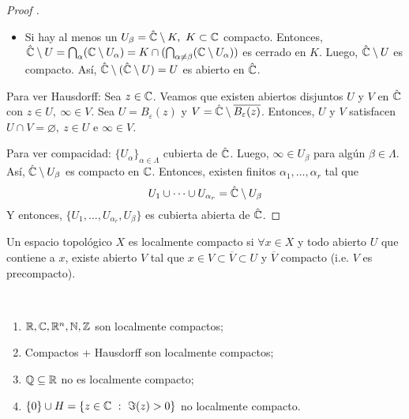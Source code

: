 \begin{proof}[Proof ]
\begin{enumerate}
\begin{itemize}
			\item Si hay al menos un $U_{\beta} = \hat{\mathbb{C}} \setminus K,\ K \subset \mathbb{C}$ compacto. Entonces, $\hat{\mathbb{C}} \setminus U = \bigcap_{\alpha} (\mathbb{C} \setminus U_{\alpha}) = K \cap (\bigcap_{\alpha \neq \beta} (\mathbb{C} \setminus U_{\alpha}))$ es cerrado en $K$. Luego, $\hat{\mathbb{C}} \setminus U$ es compacto. Así, $\hat{\mathbb{C}} \setminus (\hat{\mathbb{C}} \setminus U) = U$ es abierto en $\hat{\mathbb{C}}$.
		\end{itemize}
	\end{enumerate}
	\hspace{4mm} Para ver Hausdorff: Sea $z \in \mathbb{C}$. Veamos que existen abiertos disjuntos $U$ y $V$ en $\hat{\mathbb{C}}$ con $z \in U,\ \infty \in V$. Sea $U = B_{\varepsilon}(z)$ y $V = \hat{\mathbb{C}} \setminus \overline{B_{\varepsilon}(z)}$. Entonces, $U$ y $V$ satisfacen $U \cap V = \varnothing,\ z \in U$ e $\infty \in V$.\par
	Para ver compacidad: $\{U_{\alpha}\}_{\alpha\in\Lambda}$ cubierta de $\hat{\mathbb{C}}$. Luego, $\infty \in U_{\beta}$ para algún $\beta \in \Lambda$. Así, $\hat{\mathbb{C}} \setminus U_{\beta}$ es compacto en $\mathbb{C}$. Entonces, existen finitos $\alpha_{1},\dots,\alpha_{r}$ tal que
	\[ U_{1} \cup \cdots \cup U_{\alpha_r} = \hat{\mathbb{C}} \setminus U_{\beta} \]
	Y entonces, $\{U_{1},\dots,U_{\alpha_{r}},U_{\beta}\}$ es cubierta abierta de $\hat{\mathbb{C}}$.
\end{proof}

\begin{definition}
	Un espacio topológico $X$ es localmente compacto si $\forall x \in X$ y todo abierto $U$ que contiene a $x$, existe abierto $V$ tal que $x \in V \subset \overline{V} \subset U$ y $\overline{V}$ compacto (i.e. $V$ es precompacto).
\end{definition}

\begin{eg}~
	\begin{enumerate}
		\item $\mathbb{R},\mathbb{C},\mathbb{R}^n,\mathbb{N},\mathbb{Z}$ son localmente compactos;

		\item Compactos + Hausdorff son localmente compactos;

		\item $\mathbb{Q} \subseteq \mathbb{R}$ no es localmente compacto;

		\item $\{0\} \cup H = \{z \in \mathbb{C} \ : \ \Im(z) > 0\}$ no localmente compacto.
	\end{enumerate}
\end{eg}

